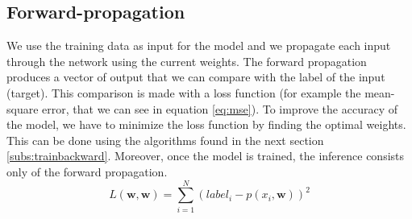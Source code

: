 \subsection{Forward-propagation} \label{subs:trainforward}
We use the training data as input for the model and we propagate each input through the network using the current weights. The forward propagation produces a vector of output that we can compare with the label of the input (target). This comparison is made with a loss function (for example the mean-square error, that we can see in equation \eqref{eq:mse}). To improve the accuracy of the model, we have to minimize the loss function by finding the optimal weights. This can be done using the algorithms found in the next section \ref{subs:trainbackward}. Moreover, once the model is trained, the inference consists only of the forward propagation.
%
\begin{equation}
    L(\boldsymbol{w}, \boldsymbol{w}) = \sum^{N}_{i=1} (label_i - p(x_i, \boldsymbol{w}))^2
    \label{eq:mse}
\end{equation}
